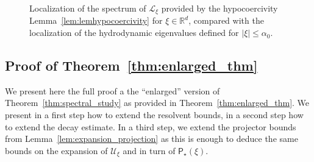 \documentclass[10pt]{amsart}
\theoremstyle{definition}\newtheorem{defi}[theo]{Definition}\newtheorem{rema}[theo]{Remark}\newtheorem{exam}[theo]{Example}\newtheorem{exem}[theo]{Example}\newtheorem{nota}[theo]{Notation}
\newcommand{\Inc}{\mathrm{inc}}
\newcommand{\Bou}{\mathrm{Bou}}
\newcommand{\R}{\mathbb{R}}
\newcommand{\LL}{\mathcal{L}}
\newcommand{\PP}{\mathsf{P}}
\newcommand{\UU}{\mathcal{U}}
\renewcommand*\le{\leqslant}
\begin{document}
\begin{figure}[h]
\centering


\caption{Localization of the spectrum of $\LL_\xi $ provided by the hypocoercivity Lemma~\ref{lem:lemhypocoercivity} for $\xi \in \R^d$, compared with the localization of the hydrodynamic eigenvalues defined for $|\xi| \le \alpha_0$.}
\end{figure}

\subsection{Proof of Theorem~\ref{thm:enlarged_thm}}

We present here the full proof a the ``enlarged'' version of Theorem~\ref{thm:spectral_study} as provided in Theorem~\ref{thm:enlarged_thm}. We present in a first step how to extend the resolvent bounds, in a second step how to extend the decay estimate. In a third step, we extend the projector bounds from Lemma~\ref{lem:expansion_projection} as this is enough to deduce the same bounds on the expansion of $\UU_\xi$ and in turn of $\PP_\star(\xi)$.
\end{document}
